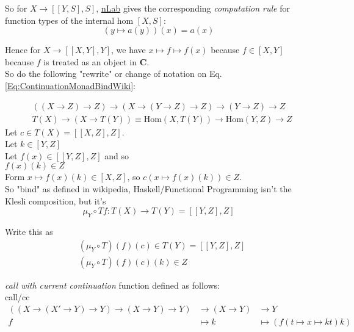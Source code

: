 \documentclass[10pt]{amsart}
\begin{document}
\begin{multicols*}{2}
So for $X \to [[Y, S], S]$, \href{https://ncatlab.org/nlab/show/internal+hom}{nLab} gives the corresponding \emph{computation rule} for function types of the internal hom $[X, S]$:
\[
(y \mapsto a(y))(x) = a(x)
\]

Hence for $X \to [[X, Y], Y]$, we have $x\mapsto f \mapsto f(x)$ because $f \in [X, Y]$ because $f$ is treated as an object in $\mathbf{C}$. \\

So do the following "rewrite" or change of notation on Eq. \ref{Eq:ContinuationMonadBindWiki}:

\begin{equation}\label{Eq:ContinuationMonadBindWiki2}
\begin{aligned}
& ((X \to Z) \to Z) \to (X \to (Y\to Z) \to Z) \to (Y \to Z) \to Z \\ 
& T(X) \to (X \to T(Y)) \equiv \text{Hom}(X, T(Y)) \to \text{Hom}(Y,Z) \to Z
\end{aligned}
\end{equation}
Let $c\in T(X) = [[X,Z], Z]$. \\
Let $k \in [Y,Z]$ \\
Let $f(x) \in [[Y,Z], Z]$ and so \\
$f(x)(k) \in Z$ \\

Form $x \mapsto f(x)(k) \in [X,Z]$, so $c(x\mapsto f(x)(k)) \in Z$. \\

So "bind" as defined in wikipedia, Haskell/Functional Programming isn't the Klesli composition, but it's
\[
\mu_Y \circ Tf : T(X) \to T(Y) = [[Y,Z], Z]
\]

Write this as 
\begin{equation}
\boxed{
\begin{aligned}
& (\mu_Y \circ T)(f)(c) \in T(Y) = [[Y,Z], Z] \\
& (\mu_Y \circ T)(f)(c)(k) \in Z
\end{aligned}}
\end{equation}


\emph{call with current continuation} function defined as follows: \\
call/cc
\begin{equation}\label{Eq:CallCurrentContinuationContinuationMonad}
\begin{aligned}
((X \to (X' \to Y) \to Y) \to (X\to Y) \to Y) & \to (X\to Y)  & \to Y \\ 
f & \mapsto k & \mapsto (f(t\mapsto x \mapsto kt) k) 
\end{aligned}
\end{equation}


\end{multicols*}
\end{document}
